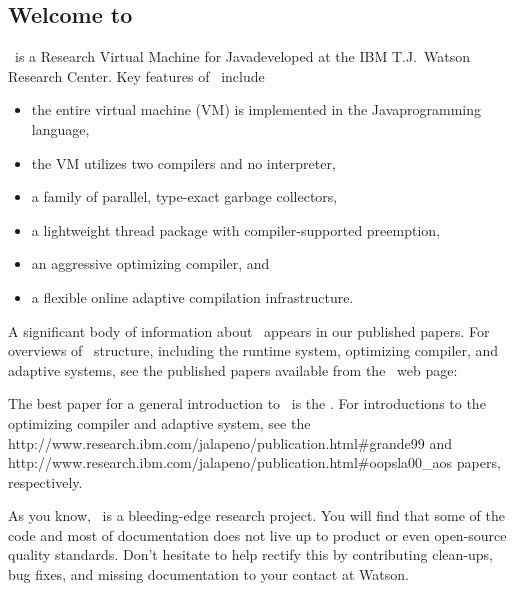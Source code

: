 \subsection {Welcome to \jp}

\jp\ is a Research Virtual Machine for Java\trademark developed at the IBM T.J.\ Watson 
Research Center.  Key features of \jp\ include 
\begin{itemize}
\item the entire virtual machine (VM) is implemented in the
  Java\trademark  programming language,
\item the VM utilizes two compilers and no interpreter,
\item a family of parallel, type-exact garbage collectors,
\item a lightweight thread package with compiler-supported preemption,
\item an aggressive optimizing compiler, and 
\item a flexible online adaptive compilation infrastructure.
\end{itemize}

A significant body of information about \jp\ appears in our published
papers.  For overviews of \jp\ structure, including the runtime system,
optimizing compiler, and adaptive systems, see the published papers
available from the \jp\ web page:
\begin{quote}
\end{quote}

The best paper for a general introduction to \jp\ is 
the 
.  
For introductions to the
optimizing compiler and adaptive system, see the 
{http://www.research.ibm.com/jalapeno/publication.html\#grande99}
 and 
{http://www.research.ibm.com/jalapeno/publication.html\#oopsla00\_aos}  
papers, respectively.

As you know, \jp\ is a bleeding-edge research project.  You will find that
some of the code and most of documentation does not live up to product or 
even open-source quality standards. Don't hesitate to help rectify this by
contributing clean-ups, bug fixes, and missing documentation to your
contact at Watson.  

